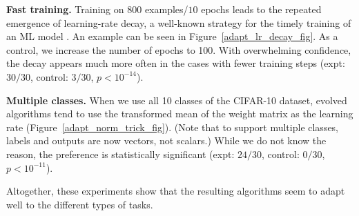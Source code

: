\textbf{Fast training.} Training on $800$ examples/$10$ epochs leads to the repeated emergence of learning-rate decay, a well-known strategy for the timely training of an ML model \cite{bengio2012practical}. An example can be seen in Figure~\ref{adapt_lr_decay_fig}. As a control, we increase the number of epochs to 100. With overwhelming confidence, the decay appears much more often in the cases with fewer training steps (expt: $30/30$, control: $3/30$, $p\!<\!10^{-14}$).

\textbf{Multiple classes.} When we use all 10 classes of the CIFAR-10 dataset, evolved algorithms tend to use the transformed mean of the weight matrix as the learning rate (Figure~\ref{adapt_norm_trick_fig}). (Note that to support multiple classes, labels and outputs are now vectors, not scalars.) While we do not know the reason, the preference is statistically significant (expt: $24/30$, control: $0/30$, $p\!<\!10^{-11}$).

Altogether, these experiments show that the resulting algorithms seem to adapt well to the different types of tasks.
